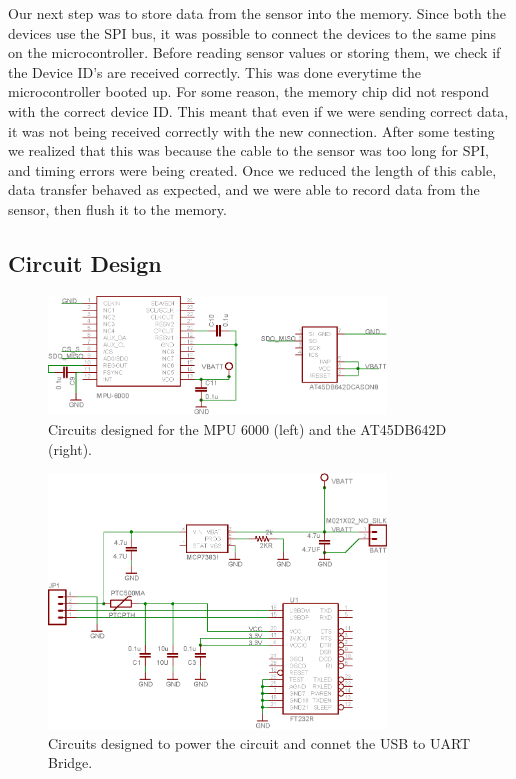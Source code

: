 Our next step was to store data from the sensor into the memory.
Since both the devices use the SPI bus,
it was possible to connect the devices to the same pins on the microcontroller.
Before reading sensor values or storing them,
we check if the Device ID's are received correctly.
This was done everytime the microcontroller booted up.
For some reason, the memory chip did not respond with the correct device ID.
This meant that even if we were sending correct data,
it was not being received correctly with the new connection.
After some testing we realized that this was because the cable to the sensor was too long for SPI,
and timing errors were being created.
Once we reduced the length of this cable,
data transfer behaved as expected,
and we were able to record data from the sensor,
then flush it to the memory.

\subsection{Circuit Design}
\label{Sec:CircuitDesign}

\begin{figure}
\begin{center}
\includegraphics[width=0.8\textwidth]{images/MPU6000Circuit.eps}
\caption{Circuits designed for the MPU 6000 (left) and the AT45DB642D (right).}
\label{Fig:MPUCkt}
\end{center}
\end{figure}

\begin{figure}
\begin{center}
\includegraphics[width=0.8\textwidth]{images/USBPOWER.eps}
\caption{Circuits designed to power the circuit and connet the USB to UART Bridge.}
\label{Fig:USBPOWER}
\end{center}
\end{figure}

